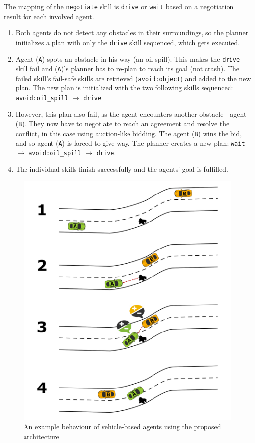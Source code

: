 \documentclass[main.tex]{subfiles}
\begin{document}
The mapping of the \texttt{negotiate} skill is \texttt{drive} or \texttt{wait} based on 
a negotiation result for each involved agent.

\begin{enumerate}
    \item Both agents do not detect any obstacles in their surroundings, so the planner
    initializes a plan with only the \texttt{drive} skill sequenced, which gets executed. 

    \item Agent (\texttt{A}) spots an obstacle in his way (an oil spill). This makes the
    \texttt{drive} skill fail and (\texttt{A})'s planner has to re-plan to reach its goal (not
    crash). The failed skill's fail-safe skills are retrieved (\texttt{avoid:object})
    and added to the new plan. The new plan is initialized with the two
    following skills sequenced: \texttt{avoid:oil\_spill} $\rightarrow$ \texttt{drive}.
    
    \item However, this plan also fail, as the agent encounters another obstacle - agent
    (\texttt{B}). They now have to negotiate to reach an agreement and resolve the conflict, in
    this case using auction-like bidding. The agent (\texttt{B}) wins the bid, and so agent
    (\texttt{A}) is forced to give way. The planner creates a new plan: \texttt{wait}
    $\rightarrow$ \texttt{avoid:oil\_spill} $\rightarrow$ \texttt{drive}.

    \item The individual skills finish successfully and the agents' goal is fulfilled.
\end{enumerate}

\begin{figure}[htbp]
    \centering
    \includegraphics[width=.8\textwidth]{AgentPlanning.png}
    \caption{An example behaviour of vehicle-based agents using the proposed architecture}
    \label{agentReplanning}
\end{figure}
\end{document}
